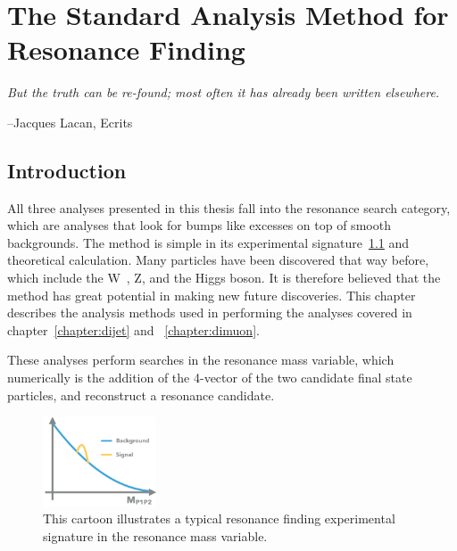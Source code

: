 \chapter{The Standard Analysis Method for Resonance Finding}
\label{StandardAnalysisMethod}

\epigraph{\textit{But the truth can be re-found; most often it has already been written elsewhere.}}{--Jacques Lacan, Ecrits}



\section{Introduction}
All three analyses presented in this thesis fall into the resonance search category, which are analyses that look for bumps like excesses on top of smooth backgrounds. The method is simple in its experimental signature~\ref{fig:bump} and theoretical calculation. Many particles have been discovered that way before, which include the W~\cite{Arnison:142059}, Z, and the Higgs boson. It is therefore believed that the method has great potential in making new future discoveries. This chapter describes the analysis methods used in performing the analyses covered in chapter~\ref{chapter:dijet} and ~\ref{chapter:dimuon}. 

These analyses perform searches in the resonance mass variable, which numerically is the addition of the 4-vector of the two candidate final state particles, and reconstruct a resonance candidate. 

\begin{figure}[!htb]
    \begin{center}
        \includegraphics[width=0.3\textwidth]{figures/chapter_analysismethod/resonance}
        \caption{
            This cartoon illustrates a typical resonance finding experimental signature in the resonance mass variable. 
        }
        \label{fig:bump}
    \end{center}
\end{figure}
\FloatBarrier

